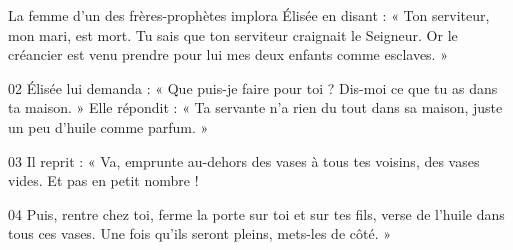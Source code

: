  La femme d’un des frères-prophètes implora Élisée en disant : « Ton serviteur, mon mari, est mort. Tu sais que ton serviteur craignait le Seigneur. Or le créancier est venu prendre pour lui mes deux enfants comme esclaves. »

02 Élisée lui demanda : « Que puis-je faire pour toi ? Dis-moi ce que tu as dans ta maison. » Elle répondit : « Ta servante n’a rien du tout dans sa maison, juste un peu d’huile comme parfum. »

03 Il reprit : « Va, emprunte au-dehors des vases à tous tes voisins, des vases vides. Et pas en petit nombre !

04 Puis, rentre chez toi, ferme la porte sur toi et sur tes fils, verse de l’huile dans tous ces vases. Une fois qu’ils seront pleins, mets-les de côté. »
